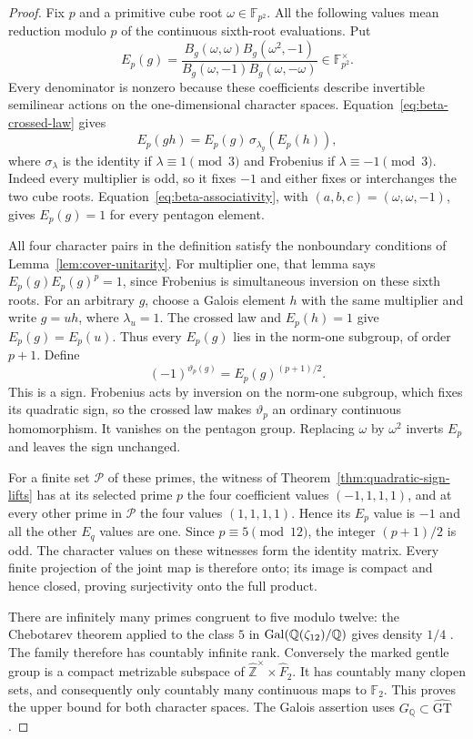 \begin{proof}
Fix $p$ and a primitive cube root $\omega\in\mathbb F_{p^2}$.
All the following values mean reduction modulo $p$ of the continuous
sixth-root evaluations. Put
\[
 E_p(g)=
 \frac{B_g(\omega,\omega)B_g(\omega^2,-1)}
      {B_g(\omega,-1)B_g(\omega,-\omega)}
        \in\mathbb F_{p^2}^{\times}.
\]
Every denominator is nonzero because these coefficients describe
invertible semilinear actions on the one-dimensional character spaces.
Equation~\eqref{eq:beta-crossed-law} gives
\[
 E_p(gh)=E_p(g)\,\sigma_{\lambda_g}(E_p(h)),
\]
where $\sigma_\lambda$ is the identity if $\lambda\equiv1\pmod3$
and Frobenius if $\lambda\equiv-1\pmod3$. Indeed every multiplier
is odd, so it fixes $-1$ and either fixes or interchanges the two
cube roots. Equation~\eqref{eq:beta-associativity}, with
$(a,b,c)=(\omega,\omega,-1)$, gives $E_p(g)=1$ for every pentagon
element.

All four character pairs in the definition satisfy the nonboundary
conditions of Lemma~\ref{lem:cover-unitarity}. For multiplier one,
that lemma says $E_p(g)E_p(g)^p=1$, since Frobenius is simultaneous
inversion on these sixth roots. For an arbitrary $g$, choose a Galois
element $h$ with the same multiplier and write $g=uh$, where
$\lambda_u=1$. The crossed law and $E_p(h)=1$ give $E_p(g)=E_p(u)$.
Thus every $E_p(g)$ lies in the norm-one subgroup, of order $p+1$.
Define
\[
 (-1)^{\vartheta_p(g)}=E_p(g)^{(p+1)/2}.
\]
This is a sign. Frobenius acts by inversion on the norm-one subgroup,
which fixes its quadratic sign, so the crossed law makes
$\vartheta_p$ an ordinary continuous homomorphism. It vanishes on
the pentagon group. Replacing $\omega$ by $\omega^2$ inverts $E_p$
and leaves the sign unchanged.

For a finite set $\mathcal P$ of these primes, the witness of
Theorem~\ref{thm:quadratic-sign-lifts} has at its selected prime $p$
the four coefficient values $(-1,1,1,1)$, and at every other prime
in $\mathcal P$ the four values $(1,1,1,1)$. Hence its $E_p$ value
is $-1$ and all the other $E_q$ values are one. Since
$p\equiv5\pmod{12}$, the integer $(p+1)/2$ is odd. The character
values on these witnesses form the identity matrix. Every finite
projection of the joint map is therefore onto; its image is compact
and hence closed, proving surjectivity onto the full product.

There are infinitely many primes congruent to five modulo twelve:
the Chebotarev theorem applied to the class $5$ in
$\operatorname{Gal}(\mathbb Q(\zeta_{12})/\mathbb Q)$ gives density $1/4$
\cite[Chapter V, Theorem 3.23, p.~164]{MilneCFT}.
The family therefore has countably infinite
rank. Conversely the marked gentle group is a compact metrizable
subspace of $\widehat{\mathbb Z}^{\times}\times\widehat F_2$.
It has countably many clopen sets, and consequently only countably
many continuous maps to $\mathbb F_2$. This proves the upper bound
for both character spaces. The Galois assertion uses
$G_{\mathbb Q}\subset\widehat{\mathrm{GT}}$.
\end{proof}

